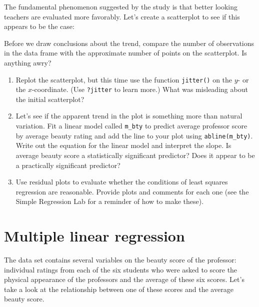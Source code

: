 \documentclass[]{book}
\newenvironment{Shaded}{\begin{snugshade}}{\end{snugshade}}
\newcommand{\KeywordTok}[1]{\textcolor[rgb]{0.13,0.29,0.53}{\textbf{{#1}}}}
\newcommand{\StringTok}[1]{\textcolor[rgb]{0.31,0.60,0.02}{{#1}}}
\newcommand{\NormalTok}[1]{{#1}}
\theoremstyle{definition}
\theoremstyle{definition}
\theoremstyle{remark}
\begin{document}
The fundamental phenomenon suggested by the study is that better looking
teachers are evaluated more favorably. Let's create a scatterplot to see
if this appears to be the case:

\begin{Shaded}
\end{Shaded}

Before we draw conclusions about the trend, compare the number of
observations in the data frame with the approximate number of points on
the scatterplot. Is anything awry?

\begin{enumerate}
\def\labelenumi{\arabic{enumi}.}
\setcounter{enumi}{3}
\item
  Replot the scatterplot, but this time use the function
  \texttt{jitter()} on the \(y\)- or the \(x\)-coordinate. (Use
  \texttt{?jitter} to learn more.) What was misleading about the initial
  scatterplot?
\item
  Let's see if the apparent trend in the plot is something more than
  natural variation. Fit a linear model called \texttt{m\_bty} to
  predict average professor score by average beauty rating and add the
  line to your plot using \texttt{abline(m\_bty)}. Write out the
  equation for the linear model and interpret the slope. Is average
  beauty score a statistically significant predictor? Does it appear to
  be a practically significant predictor?
\item
  Use residual plots to evaluate whether the conditions of least squares
  regression are reasonable. Provide plots and comments for each one
  (see the Simple Regression Lab for a reminder of how to make these).
\end{enumerate}

\section*{Multiple linear regression}\label{multiple-linear-regression}

The data set contains several variables on the beauty score of the
professor: individual ratings from each of the six students who were
asked to score the physical appearance of the professors and the average
of these six scores. Let's take a look at the relationship between one
of these scores and the average beauty score.
\end{document}
